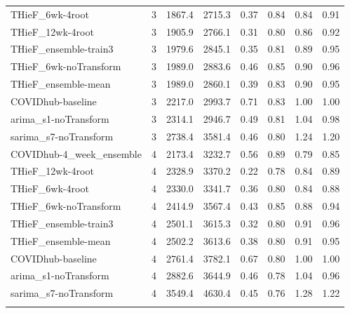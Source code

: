 \documentclass[thesis]{umassthesis}  %
\begin{document}
\begin{longtable}{lrrrrrrr}
  THieF\_6wk-4root & 3 & 1867.4 & 2715.3 & 0.37 & 0.84 & 0.84 & 0.91 \\ 
  THieF\_12wk-4root & 3 & 1905.9 & 2766.1 & 0.31 & 0.80 & 0.86 & 0.92 \\ 
  THieF\_ensemble-train3 & 3 & 1979.6 & 2845.1 & 0.35 & 0.81 & 0.89 & 0.95 \\ 
  THieF\_6wk-noTransform & 3 & 1989.0 & 2883.6 & 0.46 & 0.85 & 0.90 & 0.96 \\ 
  THieF\_ensemble-mean & 3 & 1989.0 & 2860.1 & 0.39 & 0.83 & 0.90 & 0.95 \\ 
  COVIDhub-baseline & 3 & 2217.0 & 2993.7 & 0.71 & 0.83 & 1.00 & 1.00 \\ 
  arima\_s1-noTransform & 3 & 2314.1 & 2946.7 & 0.49 & 0.81 & 1.04 & 0.98 \\ 
  sarima\_s7-noTransform & 3 & 2738.4 & 3581.4 & 0.46 & 0.80 & 1.24 & 1.20 \\ 
  COVIDhub-4\_week\_ensemble & 4 & 2173.4 & 3232.7 & 0.56 & 0.89 & 0.79 & 0.85 \\ 
  THieF\_12wk-4root & 4 & 2328.9 & 3370.2 & 0.22 & 0.78 & 0.84 & 0.89 \\ 
  THieF\_6wk-4root & 4 & 2330.0 & 3341.7 & 0.36 & 0.80 & 0.84 & 0.88 \\ 
  THieF\_6wk-noTransform & 4 & 2414.9 & 3567.4 & 0.43 & 0.85 & 0.88 & 0.94 \\ 
  THieF\_ensemble-train3 & 4 & 2501.1 & 3615.3 & 0.32 & 0.80 & 0.91 & 0.96 \\ 
  THieF\_ensemble-mean & 4 & 2502.2 & 3613.6 & 0.38 & 0.80 & 0.91 & 0.95 \\ 
  COVIDhub-baseline & 4 & 2761.4 & 3782.1 & 0.67 & 0.80 & 1.00 & 1.00 \\ 
  arima\_s1-noTransform & 4 & 2882.6 & 3644.9 & 0.46 & 0.78 & 1.04 & 0.96 \\ 
  sarima\_s7-noTransform & 4 & 3549.4 & 4630.4 & 0.45 & 0.76 & 1.28 & 1.22 \\ 
   \hline
\hline
\label{tab:table_horizon_us}
\end{longtable}
\endgroup

\newpage
\end{document}
